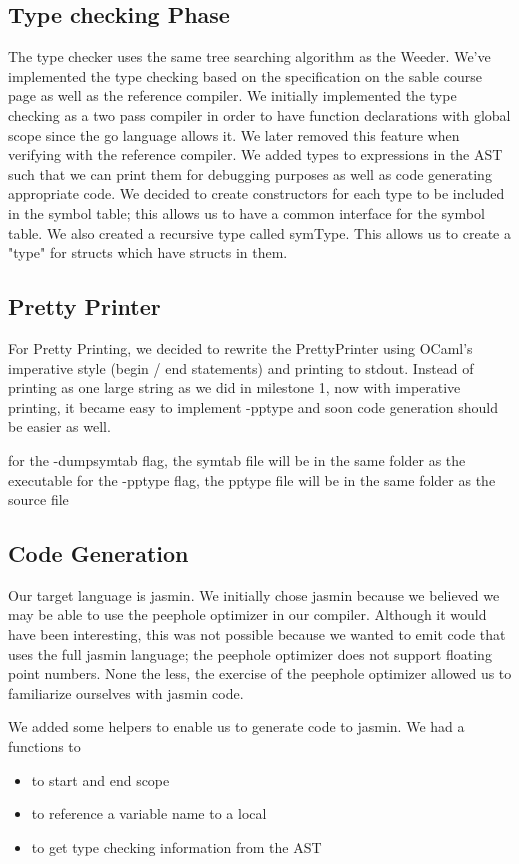 \documentclass{article}
\begin{document}
\subsection{Type checking Phase}
The type checker uses the same tree searching algorithm as the Weeder. We've implemented the type checking based on the specification on the sable course page as well as the reference compiler. We initially implemented the type checking as a two pass compiler in order to have function declarations with global scope since the go language allows it. We later removed this feature when verifying with the reference compiler. We added types to expressions in the AST such that we can print them for debugging purposes as well as code generating appropriate code. We decided to create constructors for each type to be included in the symbol table; this allows us to have a common interface for the symbol table. We also created a recursive type called symType. This allows us to create a "type" for structs which have structs in them.

\subsection{Pretty Printer}
For Pretty Printing, we decided to rewrite the PrettyPrinter using OCaml's imperative style (begin / end statements) and printing to stdout. Instead of printing as one large string as we did in milestone 1, now with imperative printing, it became easy to implement -pptype and soon code generation should be easier as well.

for the -dumpsymtab flag, the symtab file will be in the same folder as the executable
for the -pptype flag, the pptype file will be in the same folder as the source file

\subsection{Code Generation}
Our target language is jasmin. We initially chose jasmin because we believed we may be able to use the peephole optimizer in our compiler. Although it would have been interesting, this was not possible because we wanted to emit code that uses the full jasmin language; the peephole optimizer does not support floating point numbers. None the less, the exercise of the peephole optimizer allowed us to familiarize ourselves with jasmin code. 


We added some helpers to enable us to generate code to jasmin. We had a functions to 
\begin{itemize}
\item to start and end scope
\item to reference a variable name to a local
\item to get type checking information from the AST
\end{itemize}
\end{document}

